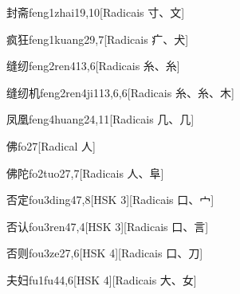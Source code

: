 \begin{entry}{封斋}{feng1zhai1}{9,10}[Radicais ⼨、⽂]
\end{entry}

\begin{entry}{疯狂}{feng1kuang2}{9,7}[Radicais ⽧、⽝]
\end{entry}

\begin{entry}{缝纫}{feng2ren4}{13,6}[Radicais ⽷、⽷]
\end{entry}

\begin{entry}{缝纫机}{feng2ren4ji1}{13,6,6}[Radicais ⽷、⽷、⽊]
\end{entry}

\begin{entry}{凤凰}{feng4huang2}{4,11}[Radicais ⼏、⼏]
\end{entry}

\begin{entry}{佛}{fo2}{7}[Radical ⼈]
\end{entry}

\begin{entry}{佛陀}{fo2tuo2}{7,7}[Radicais ⼈、⾩]
\end{entry}

\begin{entry}{否定}{fou3ding4}{7,8}[HSK 3][Radicais ⼝、⼧]
\end{entry}

\begin{entry}{否认}{fou3ren4}{7,4}[HSK 3][Radicais ⼝、⾔]
\end{entry}

\begin{entry}{否则}{fou3ze2}{7,6}[HSK 4][Radicais ⼝、⼑]
\end{entry}

\begin{entry}{夫妇}{fu1fu4}{4,6}[HSK 4][Radicais ⼤、⼥]
\end{entry}

